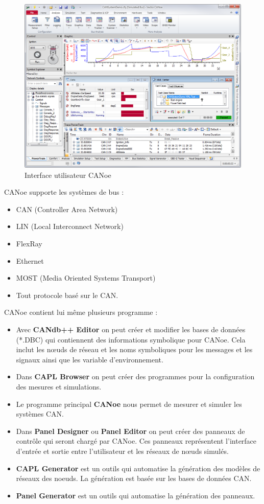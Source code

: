 \begin{figure}[H]
 \centering
 \includegraphics[scale=0.4]{images/canoe_ui}
 \caption{Interface utilisateur CANoe}
\end{figure}

\noindent CANoe supporte les systèmes de bus :
\begin{itemize}
	\item CAN (Controller Area Network)
	\item LIN (Local Interconnect Network)
	\item FlexRay
	\item Ethernet
	\item MOST (Media Oriented Systems Transport)
	\item Tout protocole basé sur le CAN.
\end{itemize} 

\medskip
\noindent CANoe contient lui même plusieurs programme : 
\begin{itemize}
	\item Avec \textbf{CANdb++ Editor} on peut créer et modifier les bases de données (*.DBC) qui contiennent des informations symbolique pour CANoe. Cela inclut les nœuds de réseau et les noms symboliques pour les messages et les signaux ainsi que les variable d'environnement.
	\item Dans \textbf{CAPL Browser} on peut créer des programmes pour la configuration des mesures et simulations.
	\item Le programme principal \textbf{CANoe} nous permet de mesurer et simuler les systèmes CAN.
	\item Dans \textbf{Panel Designer} ou \textbf{Panel Editor} on peut créer des panneaux de contrôle qui seront chargé par CANoe. Ces panneaux représentent l'interface d'entrée et sortie entre l'utilisateur et les réseaux de nœuds simulés.
	\item \textbf{CAPL Generator} est un outils qui automatise la génération des modèles de réseaux des noeuds. La génération est basée sur les bases de données CAN.
	\item \textbf{Panel Generator} est un outils qui automatise la génération des panneaux.
\end{itemize}

